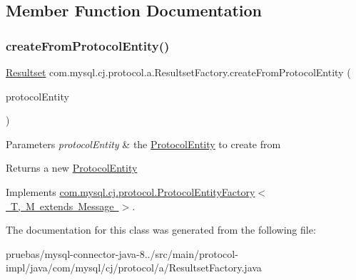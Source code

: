 \subsection{Member Function Documentation}
\mbox{\label{classcom_1_1mysql_1_1cj_1_1protocol_1_1a_1_1_resultset_factory_a3ee901bd2ae369a6c99f8c38c280c407}} 
\subsubsection{\texorpdfstring{create\+From\+Protocol\+Entity()}{createFromProtocolEntity()}}
{\footnotesize\ttfamily \mbox{\hyperlink{interfacecom_1_1mysql_1_1cj_1_1protocol_1_1_resultset}{Resultset}} com.\+mysql.\+cj.\+protocol.\+a.\+Resultset\+Factory.\+create\+From\+Protocol\+Entity (\begin{DoxyParamCaption}\item[{\mbox{\hyperlink{interfacecom_1_1mysql_1_1cj_1_1protocol_1_1_protocol_entity}{Protocol\+Entity}}}]{protocol\+Entity }\end{DoxyParamCaption})}


\begin{DoxyParams}{Parameters}
{\em protocol\+Entity} & the \mbox{\hyperlink{interfacecom_1_1mysql_1_1cj_1_1protocol_1_1_protocol_entity}{Protocol\+Entity}} to create from \\
\hline
\end{DoxyParams}
\begin{DoxyReturn}{Returns}
a new \mbox{\hyperlink{interfacecom_1_1mysql_1_1cj_1_1protocol_1_1_protocol_entity}{Protocol\+Entity}} 
\end{DoxyReturn}


Implements \mbox{\hyperlink{interfacecom_1_1mysql_1_1cj_1_1protocol_1_1_protocol_entity_factory_a282b14fecc86c7202cd9361333235ef8}{com.\+mysql.\+cj.\+protocol.\+Protocol\+Entity\+Factory$<$ T, M extends Message $>$}}.



The documentation for this class was generated from the following file\+:\begin{DoxyCompactItemize}
\item 
pruebas/mysql-\/connector-\/java-\/8../src/main/protocol-\/impl/java/com/mysql/cj/protocol/a/Resultset\+Factory.\+java\end{DoxyCompactItemize}
